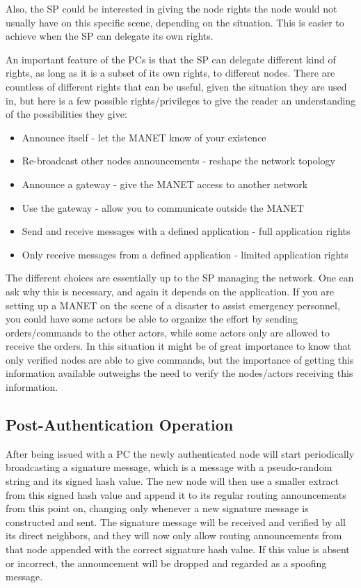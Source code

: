 Also, the \ac{SP} could be interested in giving the node rights the node would
not usually have on this specific scene, depending on the situation. This is
easier to achieve when the \ac{SP} can delegate its own rights.

An important feature of the \acp{PC} is that the \ac{SP} can delegate different
kind of rights, as long as it is a subset of its own rights, to different nodes.
There are countless of different rights that can be useful, given the situation
they are used in, but here is a few possible rights/privileges to give the
reader an understanding of the possibilities they give:

\begin{itemize}
  \item Announce itself - let the \ac{MANET} know of your existence
  \item Re-broadcast other nodes announcements - reshape the network topology
  \item Announce a gateway - give the \ac{MANET} access to another network
  \item Use the gateway - allow you to communicate outside the \ac{MANET}
  \item Send and receive messages with a defined application - full application
  rights
  \item Only receive messages from a defined application - limited application
  rights
\end{itemize}

The different choices are essentially up to the \ac{SP} managing the network.
One can ask why this is necessary, and again it depends on the application. If
you are setting up a \ac{MANET} on the scene of a disaster to assist emergency
personnel, you could have some actors be able to organize the effort by sending
orders/commands to the other actors, while some actors only are allowed to
receive the orders. In this situation it might be of great importance to know
that only verified nodes are able to give commands, but the importance of
getting this information available outweighs the need to verify the nodes/actors
receiving this information.

\subsection{Post-Authentication Operation}
After being issued with a \ac{PC} the newly authenticated node will start
periodically broadcasting a signature message, which is a message with a
pseudo-random string and its signed hash value. The new node will then use a
smaller extract from this signed hash value and append it to its regular routing
announcements from this point on, changing only whenever a new signature
message is constructed and sent. The signature message will be received and
verified by all its direct neighbors, and they will now only allow routing
announcements from that node appended with the correct signature hash value. If
this value is absent or incorrect, the announcement will be dropped and regarded
as a spoofing message.

